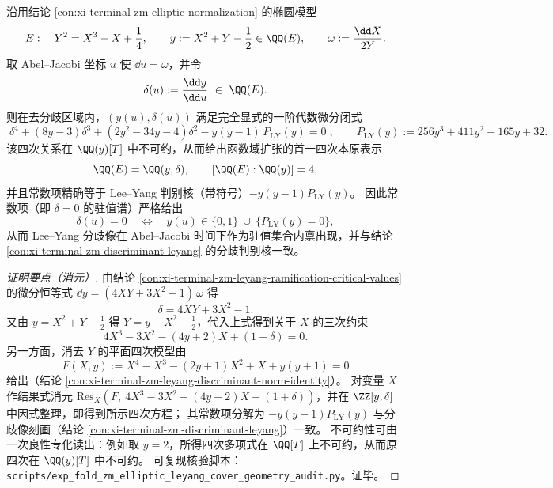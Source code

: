 \begin{conclusion}\label{con:xi-terminal-zm-leyang-abel-jacobi-ode}
沿用结论 \ref{con:xi-terminal-zm-elliptic-normalization} 的椭圆模型
\[
E:\quad Y^2=X^3-X+\frac14,
\qquad
y:=X^2+Y-\frac12\in\QQ(E),
\qquad
\omega:=\frac{\dd X}{2Y}.
\]
取 Abel--Jacobi 坐标 \(u\) 使 \(\dd u=\omega\)，并令
\[
\delta(u):=\frac{\dd y}{\dd u}\ \in\ \QQ(E).
\]
则在去分歧区域内，\((y(u),\delta(u))\) 满足完全显式的一阶代数微分闭式
\[
\boxed{\;
\delta^{4}+(8y-3)\delta^{3}+(2y^{2}-34y-4)\delta^{2}
-y(y-1)\,P_{\mathrm{LY}}(y)=0\;},
\qquad
P_{\mathrm{LY}}(y):=256y^{3}+411y^{2}+165y+32.
\]
该四次关系在 \(\QQ(y)[T]\) 中不可约，从而给出函数域扩张的首一四次本原表示
\[
\QQ(E)=\QQ(y,\delta),
\qquad
[\QQ(E):\QQ(y)]=4,
\]
并且常数项精确等于 Lee--Yang 判别核（带符号）\(-y(y-1)P_{\mathrm{LY}}(y)\)。
因此常数项（即 \(\delta=0\) 的驻值谱）严格给出
\[
\delta(u)=0\quad\Longleftrightarrow\quad
y(u)\in \{0,1\}\ \cup\ \{P_{\mathrm{LY}}(y)=0\},
\]
从而 Lee--Yang 分歧像在 Abel--Jacobi 时间下作为驻值集合内禀出现，并与结论 \ref{con:xi-terminal-zm-discriminant-leyang} 的分歧判别核一致。
\end{conclusion}
\begin{proof}[证明要点（消元）]
由结论 \ref{con:xi-terminal-zm-leyang-ramification-critical-values} 的微分恒等式
\(
\dd y=(4XY+3X^2-1)\,\omega
\)
得
\[
\delta=4XY+3X^2-1.
\]
又由 \(y=X^2+Y-\tfrac12\) 得 \(Y=y-X^2+\tfrac12\)，代入上式得到关于 \(X\) 的三次约束
\[
4X^{3}-3X^{2}-(4y+2)X+(1+\delta)=0.
\]
另一方面，消去 \(Y\) 的平面四次模型由
\[
F(X,y):=X^{4}-X^{3}-(2y+1)X^{2}+X+y(y+1)=0
\]
给出（结论 \ref{con:xi-terminal-zm-leyang-discriminant-norm-identity}）。
对变量 \(X\) 作结果式消元 \(\mathrm{Res}_{X}(F,\ 4X^{3}-3X^{2}-(4y+2)X+(1+\delta))\)，并在 \(\ZZ[y,\delta]\) 中因式整理，即得到所示四次方程；
其常数项分解为 \(-y(y-1)P_{\mathrm{LY}}(y)\) 与分歧像刻画（结论 \ref{con:xi-terminal-zm-discriminant-leyang}）一致。
不可约性可由一次良性专化读出：例如取 \(y=2\)，所得四次多项式在 \(\QQ[T]\) 上不可约，从而原四次在 \(\QQ(y)[T]\) 中不可约。
可复现核验脚本：\texttt{scripts/exp\_fold\_zm\_elliptic\_leyang\_cover\_geometry\_audit.py}。证毕。
\end{proof}

